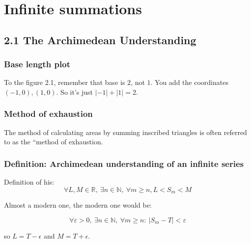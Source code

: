 \documentclass{article}
\begin{document}
\section*{Infinite summations}

\subsection*{2.1 The Archimedean Understanding}

\subsubsection*{Base length plot}
To the figure 2.1, remember that base is \(2\), not \(1\). You add the coordinates \((-1, 0), (1, 0)\).
So it's just \(|-1| + |1| = 2\).


\subsubsection*{Method of exhaustion}
The method of calculating areas by summing inscribed triangles is often referred to as
the “method of exhaustion.


\subsubsection*{Definition: Archimedean understanding of an infinite series}
Definition of his:
\begin{equation*}
    \forall L, M \in \mathbb{R}, \ \exists n \in \mathbb{N}, \ \forall m \geq n, L < S_{m} < M
\end{equation*}

\par Almost a modern one, the modern one would be:

\begin{equation*}
    \forall\varepsilon>0,~\exists n\in \mathbb{N},~\forall m\geq n:~|S_m - T|<\varepsilon
\end{equation*}

so \(L = T - \epsilon\) and \(M = T + \epsilon\).
\end{document}
